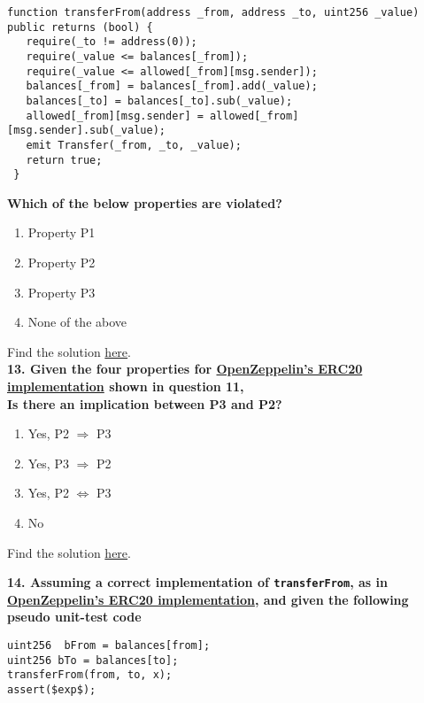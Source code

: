 \begin{lstlisting}[language=Solidity, style=solStyle]
function transferFrom(address _from, address _to, uint256 _value) public returns (bool) {
   require(_to != address(0));
   require(_value <= balances[_from]);
   require(_value <= allowed[_from][msg.sender]);
   balances[_from] = balances[_from].add(_value);
   balances[_to] = balances[_to].sub(_value);
   allowed[_from][msg.sender] = allowed[_from][msg.sender].sub(_value);
   emit Transfer(_from, _to, _value);
   return true;
 }
\end{lstlisting}

\textbf{Which of the below properties are violated?}

\begin{enumerate}[label=\Alph*.]
    \item Property P1
    \item Property P2
    \item Property P3
    \item None of the above
\end{enumerate}

Find the solution \hyperref[sec:raceXcertora_q12]{here}.\\

\textbf{13. Given the four properties for \href{https://github.com/OpenZeppelin/openzeppelin-contracts/blob/master/contracts/token/ERC20/ERC20.sol}{OpenZeppelin's ERC20 implementation} shown in question 11,\\ Is there an implication between P3 and P2?}

\begin{enumerate}[label=\Alph*.]
    \item Yes, P2 $\Rightarrow$ P3
    \item Yes, P3 $\Rightarrow$ P2
    \item Yes, P2 $\Leftrightarrow$ P3
    \item No
\end{enumerate}

Find the solution \hyperref[sec:raceXcertora_q13]{here}.\\

\pagebreak

\textbf{14. Assuming a correct implementation of \texttt{transferFrom}, as in \href{https://github.com/OpenZeppelin/openzeppelin-contracts/blob/master/contracts/token/ERC20/ERC20.sol}{OpenZeppelin's ERC20 implementation}, and given the following pseudo unit-test code}

\begin{lstlisting}[language=Solidity, style=Solstyle]
uint256  bFrom = balances[from];
uint256 bTo = balances[to];
transferFrom(from, to, x);
assert($exp$);
\end{lstlisting}

